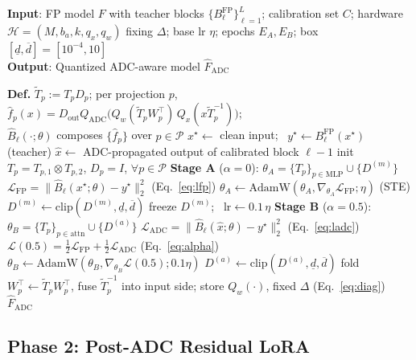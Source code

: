 \documentclass[letterpaper]{article} %
\theoremstyle{plain}
\begin{document}
\begin{algorithm}[tb]
\caption{ADC-Aware Staged PTQ Calibration (Phase 1)}
\label{alg:calibration}
\textbf{Input}: FP model $F$ with teacher blocks $\{B^{\mathrm{FP}}_\ell\}_{\ell=1}^{L}$; calibration set $C$; hardware $\mathcal{H}=(M,b_a,k,q_x,q_w)$ fixing $\Delta$; base lr $\eta$; epochs $E_A,E_B$; box $[\underline{d},\overline{d}]=[10^{-4},10]$\\
\textbf{Output}: Quantized ADC-aware model $\hat{F}_{\mathrm{ADC}}$
\begin{algorithmic}[1]
\STATE \textbf{Def.} $\tilde{T}_p:=T_pD_p$; per projection $p$,\\
\quad $\hat{f}_p(x)=D_{\mathrm{out}}Q_{\mathrm{ADC}}\!\big(Q_w(\tilde{T}_pW_p^\top)\,Q_x(x\tilde{T}_p^{-1})\big)$; \\
\quad $\hat{B}_\ell(\cdot;\theta)$ composes $\{\hat{f}_p\}$ over $p\in\mathcal{P}$
\STATE $x^{\star}\!\gets$ clean input; \ $y^{\star}\!\gets B^{\mathrm{FP}}_\ell(x^{\star})$ \hfill(teacher)
\STATE $\hat{x}\gets$ ADC-propagated output of calibrated block $\ell{-}1$
\STATE init $T_p=T_{p,1}\!\otimes T_{p,2}$, $D_p=I$, $\forall p\in\mathcal{P}$
\STATE \textbf{Stage A} ($\alpha{=}0$): $\theta_A=\{T_p\}_{p\in\mathrm{MLP}}\!\cup\{D^{(m)}\}$
\STATE $\mathcal{L}_{\mathrm{FP}}=\|\hat{B}_\ell(x^{\star};\theta)-y^{\star}\|_2^2$ \hfill(Eq.~\ref{eq:lfp})
\STATE $\theta_A\gets\mathrm{AdamW}(\theta_A,\nabla_{\theta_A}\mathcal{L}_{\mathrm{FP}};\eta)$ \hfill(STE)
\STATE $D^{(m)}\gets\mathrm{clip}(D^{(m)},\underline{d},\overline{d})$
\ENDFOR
\STATE freeze $D^{(m)}$; \ $\mathrm{lr}\gets 0.1\,\eta$
\STATE \textbf{Stage B} ($\alpha{=}0.5$): $\theta_B=\{T_p\}_{p\in\mathrm{attn}}\!\cup\{D^{(a)}\}$
\STATE $\mathcal{L}_{\mathrm{ADC}}=\|\hat{B}_\ell(\hat{x};\theta)-y^{\star}\|_2^2$ \hfill(Eq.~\ref{eq:ladc})
\STATE $\mathcal{L}(0.5)=\tfrac12\mathcal{L}_{\mathrm{FP}}+\tfrac12\mathcal{L}_{\mathrm{ADC}}$ \hfill(Eq.~\ref{eq:alpha})
\STATE $\theta_B\gets\mathrm{AdamW}(\theta_B,\nabla_{\theta_B}\mathcal{L}(0.5);0.1\eta)$
\STATE $D^{(a)}\gets\mathrm{clip}(D^{(a)},\underline{d},\overline{d})$
\ENDFOR
\STATE fold $W_p^\top\!\gets\tilde{T}_pW_p^\top$, fuse $\tilde{T}_p^{-1}$ into input side; store $Q_w(\cdot)$, fixed $\Delta$ \hfill(Eq.~\ref{eq:diag})
\ENDFOR
\RETURN $\hat{F}_{\mathrm{ADC}}$
\end{algorithmic}
\end{algorithm}

\subsection{Phase 2: Post-ADC Residual LoRA}
\end{document}
